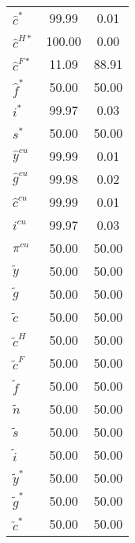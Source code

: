 \begin{center}
\begin{longtable}{lcc}
${\hat c^*}            $	 & 	             99.99	 & 	              0.01 \\ 
${\hat c^{H*}}         $	 & 	            100.00	 & 	              0.00 \\ 
${\hat c^{F*}}         $	 & 	             11.09	 & 	             88.91 \\ 
${\hat f^*}            $	 & 	             50.00	 & 	             50.00 \\ 
${i^*}                 $	 & 	             99.97	 & 	              0.03 \\ 
${s^*}                 $	 & 	             50.00	 & 	             50.00 \\ 
${\hat y^{cu}}         $	 & 	             99.99	 & 	              0.01 \\ 
${\hat g^{cu}}         $	 & 	             99.98	 & 	              0.02 \\ 
${\hat c^{cu}}         $	 & 	             99.99	 & 	              0.01 \\ 
${i^{cu}}              $	 & 	             99.97	 & 	              0.03 \\ 
${\pi^{cu}}            $	 & 	             50.00	 & 	             50.00 \\ 
${\tilde y}            $	 & 	             50.00	 & 	             50.00 \\ 
${\tilde g}            $	 & 	             50.00	 & 	             50.00 \\ 
${\tilde c}            $	 & 	             50.00	 & 	             50.00 \\ 
${\tilde c^H}          $	 & 	             50.00	 & 	             50.00 \\ 
${\tilde c^F}          $	 & 	             50.00	 & 	             50.00 \\ 
${\tilde f}            $	 & 	             50.00	 & 	             50.00 \\ 
${\tilde n}            $	 & 	             50.00	 & 	             50.00 \\ 
${\tilde s}            $	 & 	             50.00	 & 	             50.00 \\ 
${\tilde i}            $	 & 	             50.00	 & 	             50.00 \\ 
${\tilde y^*}          $	 & 	             50.00	 & 	             50.00 \\ 
${\tilde g^*}          $	 & 	             50.00	 & 	             50.00 \\ 
${\tilde c^*}          $	 & 	             50.00	 & 	             50.00 \\ 

\end{longtable}
\end{center}
